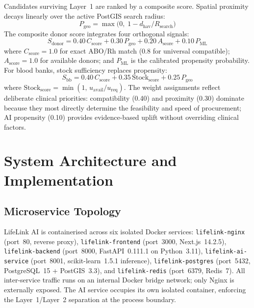 \documentclass[conference]{IEEEtran}
\begin{document}
Candidates surviving Layer~1 are ranked by a composite score. Spatial
proximity decays linearly over the active PostGIS search radius:
\begin{equation}
  P_\mathrm{geo} = \max\!\bigl(0,\;1 - d_\mathrm{hav}/R_\mathrm{search}\bigr)
\end{equation}
The composite donor score integrates four orthogonal signals:
\begin{equation}
  S_\mathrm{donor} =
    0.40\,C_\mathrm{score} + 0.30\,P_\mathrm{geo}
    + 0.20\,A_\mathrm{score} + 0.10\,P_\mathrm{ML}
  \label{eq:sdonor}
\end{equation}
where $C_\mathrm{score}=1.0$ for exact ABO/Rh match (0.8 for universal
compatible); $A_\mathrm{score}=1.0$ for available donors; and
$P_\mathrm{ML}$ is the calibrated propensity probability. For blood
banks, stock sufficiency replaces propensity:
\begin{equation}
  S_\mathrm{bb} =
    0.40\,C_\mathrm{score} + 0.35\,\mathrm{Stock}_\mathrm{score}
    + 0.25\,P_\mathrm{geo}
  \label{eq:sbb}
\end{equation}
where $\mathrm{Stock}_\mathrm{score}=\min(1,\,u_\mathrm{avail}/u_\mathrm{req})$.
The weight assignments reflect deliberate clinical priorities:
compatibility (0.40) and proximity (0.30) dominate because they most
directly determine the feasibility and speed of procurement; AI propensity
(0.10) provides evidence-based uplift without overriding clinical factors.

\section{System Architecture and Implementation}

\subsection{Microservice Topology}
LifeLink AI is containerised across six isolated Docker services:
\texttt{lifelink-nginx} (port~80, reverse proxy),
\texttt{lifelink-frontend} (port~3000, Next.js~14.2.5),
\texttt{lifelink-backend} (port~8000, FastAPI~0.111.1 on Python~3.11),
\texttt{lifelink-ai-service} (port~8001, scikit-learn~1.5.1 inference),
\texttt{lifelink-postgres} (port~5432, PostgreSQL~15 + PostGIS~3.3),
and \texttt{lifelink-redis} (port~6379, Redis~7). All inter-service
traffic runs on an internal Docker bridge network; only Nginx is
externally exposed. The AI service occupies its own isolated container,
enforcing the Layer~1/Layer~2 separation at the process boundary.
\end{document}
